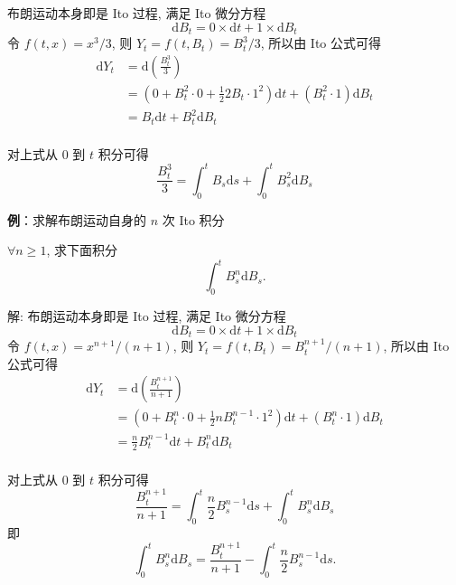 \documentclass[openany]{ctexbook}
\theoremstyle{kaiti}
\theoremstyle{normal}
\begin{document}
布朗运动本身即是 Ito 过程, 满足 Ito 微分方程 
\begin{equation}
  \mathrm{d}B_t=0\times\mathrm{d}t+1\times\mathrm{d}B_t
\end{equation} 
令 $f(t,x)=x^3/3$, 则 $Y_t=f(t,B_t)=B_t^3/3$, 所以由 Ito 公式可得
\begin{equation}
  \begin{aligned}
  \mathrm{d}Y_t&=\mathrm{d}\left(\frac{B_t^3}{3}\right)\\
  &=\left(0+B_t^2\cdot0+\frac{1}{2}2B_t\cdot1^2\right)\mathrm{d}t+(B_t^2\cdot1)\mathrm{d}B_t\\
  &=B_t\mathrm{d}t+B_t^2\mathrm{d}B_t\\
  \end{aligned}
\end{equation}

对上式从 $0$ 到 $t$ 积分可得
\begin{equation}
  \frac{B_t^3}{3}=\int_0^tB_s\mathrm{d}s+\int_0^tB_s^2\mathrm{d}B_s
\end{equation}

\textbf{例}：求解布朗运动自身的 $n$ 次 Ito 积分

$\forall n\geqslant1$, 求下面积分
\begin{equation}
  \int_0^tB_s^n\mathrm{d}B_s.
\end{equation}


解: 布朗运动本身即是 Ito 过程, 满足 Ito 微分方程 
\begin{equation}
  \mathrm{d}B_t=0\times\mathrm{d}t+1\times\mathrm{d}B_t
\end{equation} 
令 $f(t,x)=x^{n+1}/(n+1)$, 则 $Y_t=f(t,B_t)=B_t^{n+1}/(n+1)$, 所以由 Ito 公式可得 
\begin{equation}
  \begin{aligned}
  \mathrm{d}Y_t&=\mathrm{d}\left(\frac{B_t^{n+1}}{n+1}\right)\\
  &=\left(0+B_t^n\cdot0+\frac{1}{2}nB_t^{n-1}\cdot1^2\right)\mathrm{d}t+(B_t^n\cdot1)\mathrm{d}B_t\\
  &=\frac{n}{2}B_t^{n-1}\mathrm{d}t+B_t^n\mathrm{d}B_t\\
  \end{aligned}
\end{equation}

对上式从 $0$ 到 $t$ 积分可得
\begin{equation}
  \frac{B_t^{n+1}}{n+1}=\int_0^t\frac{n}{2}B_s^{n-1}\mathrm{d}s+\int_0^tB_s^n\mathrm{d}B_s
\end{equation}
即
\begin{equation}
  \int_0^tB_s^n\mathrm{d}B_s=\frac{B_t^{n+1}}{n+1}-\int_0^t\frac{n}{2}B_s^{n-1}\mathrm{d}s.
\end{equation}
\end{document}

